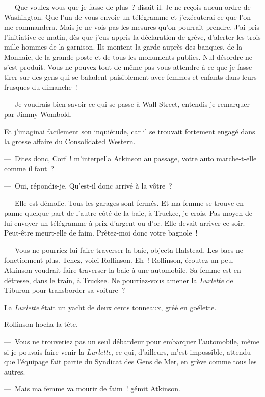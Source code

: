 \documentclass[french,twoside]{book} %
\begin{document}
— Que voulez-vous que je fasse de plus ? disait-il. Je ne reçois aucun ordre de Washington. Que l’un de vous envoie un télégramme et j’exécuterai ce que l’on me commandera. Mais je ne vois pas les mesures qu’on pourrait prendre. J’ai pris l’initiative ce matin, dès que j’eus appris la déclaration de grève, d’alerter les trois mille hommes de la garnison. Ils montent la garde auprès des banques, de la Monnaie, de la grande poste et de tous les monuments publics. Nul désordre ne s’est produit. Vous ne pouvez tout de même pas vous attendre à ce que je fasse tirer sur des gens qui se baladent paisiblement avec femmes et enfants dans leurs frusques du dimanche !\par
— Je voudrais bien savoir ce qui se passe à Wall Street, entendis-je remarquer par Jimmy Wombold.\par
Et j’imaginai facilement son inquiétude, car il se trouvait fortement engagé dans la grosse affaire du Consolidated Western.\par
— Dites donc, Corf ! m’interpella Atkinson au passage, votre auto marche-t-elle comme il faut ?\par
— Oui, répondis-je. Qu’est-il donc arrivé à la vôtre ?\par
— Elle est démolie. Tous les garages sont fermés. Et ma femme se trouve en panne quelque part de l’autre côté de la baie, à Truckee, je crois. Pas moyen de lui envoyer un télégramme à prix d’argent ou d’or. Elle devait arriver ce soir. Peut-être meurt-elle de faim. Prêtez-moi donc votre bagnole !\par
— Vous ne pourriez lui faire traverser la baie, objecta Halstead. Les bacs ne fonctionnent plus. Tenez, voici Rollinson. Eh ! Rollinson, écoutez un peu. Atkinson voudrait faire traverser la baie à une automobile. Sa femme est en détresse, dans le train, à Truckee. Ne pourriez-vous amener la \emph{Lurlette} de Tiburon pour transborder sa voiture ?\par
La \emph{Lurlette} était un yacht de deux cents tonneaux, gréé en goélette.\par
Rollinson hocha la tête.\par
— Vous ne trouveriez pas un seul débardeur pour embarquer l’automobile, même si je pouvais faire venir la \emph{Lurlette}, ce qui, d’ailleurs, m’est impossible, attendu que l’équipage fait partie du Syndicat des Gens de Mer, en grève comme tous les autres.\par
— Mais ma femme va mourir de faim ! gémit Atkinson.\par
\end{document}
